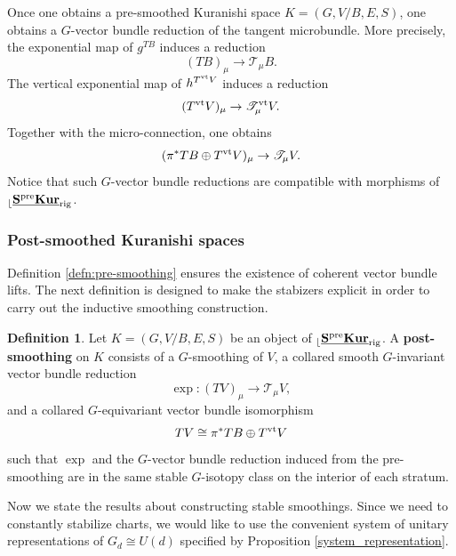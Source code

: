 \documentclass[reqno, 10pt]{amsart}
\numberwithin{equation}{section}
\numberwithin{equation}{section}
\theoremstyle{definition}
\newtheorem{defn}[thm]{Definition}
\theoremstyle{remark}
\newcommand{\beqn}{\begin{equation*}}
\newcommand{\eeqn}{\end{equation*}}
\newcommand{\ms}{\mathscr}
\renewcommand{\outer}{{}_{\lfloor}}
\newcommand{\uds}[1]{\underline{\smash{#1}}}
\begin{document}
Once one obtains a pre-smoothed Kuranishi space $K = (G, V/B, E, S)$, one obtains a $G$-vector bundle reduction of the tangent microbundle. More precisely, the exponential map of $g^{TB}$ induces a reduction 
\beqn
(TB)_\mu \to {\ms T}_\mu B.
\eeqn
The vertical exponential map of $h^{T^{\rm vt}V}$ induces a reduction
\beqn
(T^{\rm vt} V)_\mu \to {\ms T}_\mu^{\rm vt} V.
\eeqn
Together with the micro-connection, one obtains
\beqn
(\pi^* TB \oplus T^{\rm vt} V)_\mu \to {\ms T}_\mu V.
\eeqn
Notice that such $G$-vector bundle reductions are compatible with morphisms of $\outer \uds{\bf S^{\rm pre} Kur}_{\rm rig}$. 

\subsubsection{Post-smoothed Kuranishi spaces}

Definition \ref{defn:pre-smoothing} ensures the existence of coherent vector bundle lifts. The next definition is designed to make the stabizers explicit in order to carry out the inductive smoothing construction.

\begin{defn}
Let $K = (G, V/B, E, S)$ be an object of $\outer \uds{\bf S^{\rm pre} Kur}_{\rm rig}$. A {\bf post-smoothing} on $K$ consists of a $G$-smoothing of $V$, a collared smooth $G$-invariant vector bundle reduction
\beqn
\exp: (TV)_\mu \to {\ms T}_\mu V,
\eeqn
and a collared $G$-equivariant vector bundle isomorphism
\beqn
TV \cong \pi^* TB \oplus T^{\rm vt} V
\eeqn
such that $\exp$ and the $G$-vector bundle reduction induced from the pre-smoothing are in the same stable $G$-isotopy class on the interior of each stratum.
\end{defn}


Now we state the results about constructing stable smoothings. Since we need to constantly stabilize charts, we would like to use the convenient system of unitary representations of $G_d \cong U(d)$ specified by Proposition \ref{system_representation}. 
\end{document}
